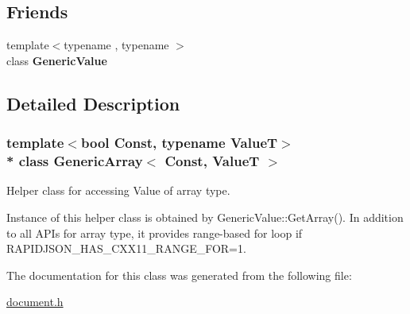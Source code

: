 \subsection*{Friends}
\begin{DoxyCompactItemize}
\item 
{\footnotesize template$<$typename , typename $>$ }\\class {\bfseries Generic\+Value}\hypertarget{a00114_a899449e1a645b5e377af059fb61113d8}{}\label{a00114_a899449e1a645b5e377af059fb61113d8}

\end{DoxyCompactItemize}


\subsection{Detailed Description}
\subsubsection*{template$<$bool Const, typename ValueT$>$\\*
class Generic\+Array$<$ Const, Value\+T $>$}

Helper class for accessing Value of array type. 

Instance of this helper class is obtained by {\ttfamily Generic\+Value\+::\+Get\+Array()}. In addition to all A\+P\+Is for array type, it provides range-\/based for loop if {\ttfamily R\+A\+P\+I\+D\+J\+S\+O\+N\+\_\+\+H\+A\+S\+\_\+\+C\+X\+X11\+\_\+\+R\+A\+N\+G\+E\+\_\+\+F\+OR=1}. 

The documentation for this class was generated from the following file\+:\begin{DoxyCompactItemize}
\item 
\hyperlink{a00473}{document.\+h}\end{DoxyCompactItemize}
